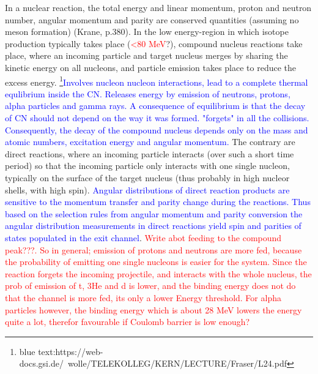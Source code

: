 In a nuclear reaction, the total energy and linear momentum, proton and neutron number, angular momentum and parity are conserved quantities (assuming no meson formation) (Krane, p.380). In the low energy-region in which isotope production typically takes place (\textcolor{red}{<80 MeV}?), compound nucleus reactions take place, where an incoming particle and target nucleus merges by sharing the kinetic energy on all nucleons, and particle emission takes place to reduce the excess energy. \textcolor{blue}{\footnote{blue text:https://web-docs.gsi.de/~wolle/TELEKOLLEG/KERN/LECTURE/Fraser/L24.pdf }Involves nucleon nucleon interactions, lead to a complete thermal equlibrium inside the CN. Releases energy by emission of neutrons, protons, alpha particles and gamma rays. A consequence of equilibrium is that the decay of CN should not depend on the way it was formed. "forgets" in all the collisions. Consequently, the decay of the compound nucleus depends only on the mass and atomic numbers, excitation energy and angular momentum.} The contrary are direct reactions, where an incoming particle interacts (over such a short time period) so that the incoming particle only interacts with one single nucleon, typically on the surface of the target nucleus (thus probably in high nucleor shells, with high spin). \textcolor{blue}{Angular distributions of direct reaction products are sensitive to the momentum transfer and parity change during the reactions. Thus based on the selection rules from angular momentum and parity conversion the angular distribution measurements in direct reactions yield spin and parities of states populated in the exit channel}. \textcolor{red}{Write abot feeding to the compound peak???. So in general; emission of protons and neutrons are more fed, because the probability of emitting one single nucleons is easier for the system. Since the reaction forgets the incoming projectile, and interacts with the whole nucleus, the prob of emission of t, 3He and d is lower, and the binding energy does not do that the channel is more fed, its only a lower Energy threshold. For alpha particles however, the binding energy which is about 28 MeV lowers the energy quite a lot, therefor favourable if Coulomb barrier is low enough?} \\



